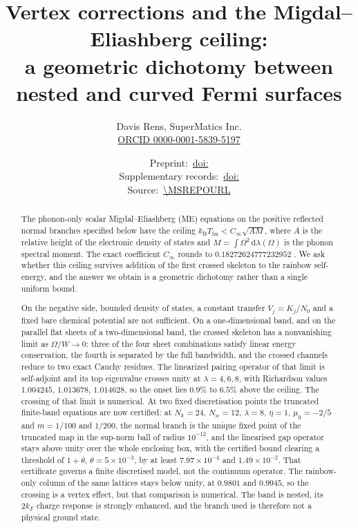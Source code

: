\documentclass[11pt]{article}
\title{Vertex corrections and the Migdal--Eliashberg ceiling:\\ a geometric dichotomy between nested and curved Fermi surfaces}
\author{Davis Rens, SuperMatics Inc.\\\href{https://orcid.org/0000-0001-5839-5197}{ORCID 0000-0001-5839-5197}}
\date{Preprint:~\href{https://doi.org/\MSPAPERDOI}{doi:\MSPAPERDOI}\\
Supplementary records:~\href{https://doi.org/\MSSUPPDOI}{doi:\MSSUPPDOI}\\
Source:~\url{\MSREPOURL}}
\newcommand{\Cinf}{C_\infty}
\newcommand{\kB}{k_{\mathrm B}}
\newcommand{\Tlin}{T_{\mathrm{lin}}}
\newcommand{\dd}{\,\mathrm d}
\theoremstyle{definition}
\theoremstyle{remark}
\begin{document}
\maketitle

\begin{abstract}
The phonon-only scalar Migdal--Eliashberg (ME) equations on the positive reflected normal branches specified below have the ceiling $\kB\Tlin<\Cinf\sqrt{AM}$, where $A$ is the relative height of the electronic density of states and $M=\int\Omega^2\dd\lambda(\Omega)$ is the phonon spectral moment. The exact coefficient $\Cinf$ rounds to $0.18272624777232952$ \cite{RensScalar}. We ask whether this ceiling survives addition of the first crossed skeleton to the rainbow self-energy, and the answer we obtain is a geometric dichotomy rather than a single uniform bound.

On the negative side, bounded density of states, a constant transfer $V_j=K_j/N_0$ and a fixed bare chemical potential are not sufficient. On a one-dimensional band, and on the parallel flat sheets of a two-dimensional band, the crossed skeleton has a nonvanishing limit as $\Omega/W\to0$: three of the four sheet combinations satisfy linear energy conservation, the fourth is separated by the full bandwidth, and the crossed channels reduce to two exact Cauchy residues. The linearized pairing operator of that limit is self-adjoint and its top eigenvalue crosses unity at $\lambda=4,6,8$, with Richardson values $1.004245$, $1.013678$, $1.014628$, so the onset lies $0.9\%$ to $6.5\%$ above the ceiling. The crossing of that limit is numerical. At two fixed discretisation points the truncated finite-band equations are now certified: at $N_k=24$, $N_w=12$, $\lambda=8$, $\eta=1$, $\mu_0=-2/5$ and $m=1/100$ and $1/200$, the normal branch is the unique fixed point of the truncated map in the sup-norm ball of radius $10^{-12}$, and the linearised gap operator stays above unity over the whole enclosing box, with the certified bound clearing a threshold of $1+\theta$, $\theta=5\times10^{-3}$, by at least $7.97\times10^{-4}$ and $1.49\times10^{-2}$. That certificate governs a finite discretised model, not the continuum operator. The rainbow-only column of the same lattices stays below unity, at $0.9801$ and $0.9945$, so the crossing is a vertex effect, but that comparison is numerical. The band is nested, its $2k_F$ charge response is strongly enhanced, and the branch used is therefore not a physical ground state.


\end{abstract}
\end{document}
